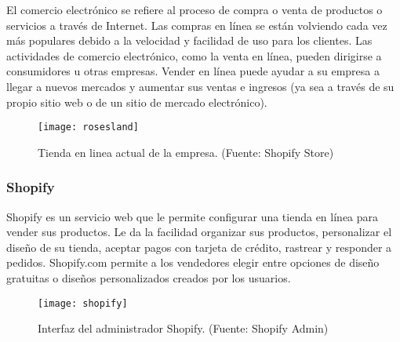 El comercio electrónico se refiere al proceso de compra o venta de productos o servicios a través de Internet. Las compras en línea se están volviendo cada vez más populares debido a la velocidad y facilidad de uso para los clientes. Las actividades de comercio electrónico, como la venta en línea, pueden dirigirse a consumidores u otras empresas. Vender en línea puede ayudar a su empresa a llegar a nuevos mercados y aumentar sus ventas e ingresos (ya sea a través de su propio sitio web o de un sitio de mercado electrónico).

\begin{figure}[H]
  \centering
  \texttt{[image: rosesland]}
  \caption{Tienda en linea actual de la empresa. (Fuente: Shopify Store)}
\end{figure}

\subsubsection{Shopify}
Shopify es un servicio web que le permite configurar una tienda en línea para vender sus productos. 
Le da la facilidad organizar sus productos, personalizar el diseño de su tienda, 
aceptar pagos con tarjeta de crédito, rastrear y responder a pedidos. 
Shopify.com permite a los vendedores elegir entre opciones de diseño gratuitas 
o diseños personalizados creados por los usuarios.

\begin{figure}[H]
  \centering
  \texttt{[image: shopify]}
  \caption{Interfaz del administrador Shopify. (Fuente: Shopify Admin)}
\end{figure}